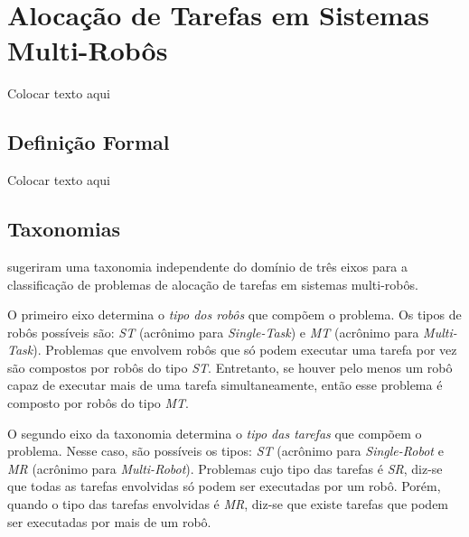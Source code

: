 \chapter[Alocação de Tarefas em Sistemas Multi-Robôs]{Alocação de Tarefas em Sistemas Multi-Robôs} \label{cap:cap3}
    Colocar texto aqui 
    
    \section{Definição Formal} \label{sec:sec3_1}
    Colocar texto aqui
    
    \section{Taxonomias} \label{sec:taxonomias}
        
         sugeriram uma taxonomia independente do domínio de três eixos para a classificação de problemas de alocação de tarefas em sistemas multi-robôs. 
        
        O primeiro eixo determina o \textit{tipo dos robôs} que compõem o problema. Os tipos de robôs possíveis são: \textit{ST} (acrônimo para \textit{Single-Task}) e \textit{MT} (acrônimo para \textit{Multi-Task}). Problemas que envolvem robôs que só podem executar uma tarefa por vez são compostos por robôs do tipo \textit{ST}. Entretanto, se houver pelo menos um robô capaz de executar mais de uma tarefa simultaneamente, então esse problema é composto por robôs do tipo \textit{MT}. 
        
        O segundo eixo da taxonomia determina o \textit{tipo das tarefas} que compõem o problema. Nesse caso, são possíveis os tipos: \textit{ST} (acrônimo para \textit{Single-Robot} e \textit{MR} (acrônimo para \textit{Multi-Robot}). Problemas cujo tipo das tarefas é \textit{SR}, diz-se que todas as tarefas envolvidas só podem ser executadas por um robô. Porém, quando o tipo das tarefas envolvidas é \textit{MR}, diz-se que existe tarefas que podem ser executadas por mais de um robô.
        

